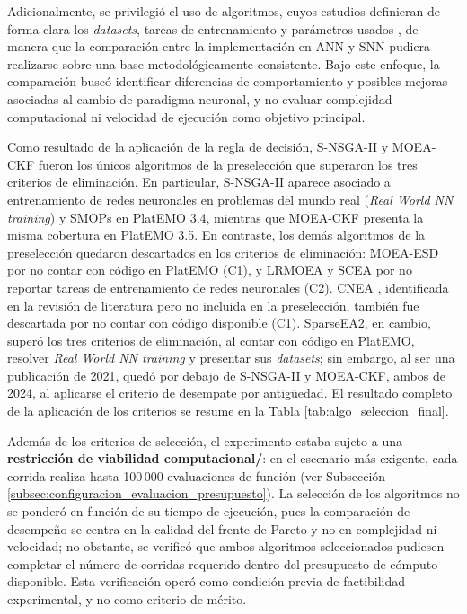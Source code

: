 Adicionalmente, se privilegió el uso de algoritmos, cuyos estudios definieran de forma clara los \textit{datasets}, tareas de entrenamiento y parámetros usados \cite{MOEA/CKF, Yue2025CNEA, 10066873_S-NSGA-II}, de manera que la comparación entre la implementación en ANN y SNN pudiera realizarse sobre una base metodológicamente consistente. Bajo este enfoque, la comparación buscó identificar diferencias de comportamiento y posibles mejoras asociadas al cambio de paradigma neuronal, y no evaluar complejidad computacional ni velocidad de ejecución como objetivo principal.

Como resultado de la aplicación de la regla de decisión, S-NSGA-II \cite{10066873_S-NSGA-II} y MOEA-CKF \cite{MOEA/CKF} fueron los únicos algoritmos de la preselección que superaron los tres criterios de eliminación. En particular, S-NSGA-II aparece asociado a entrenamiento de redes neuronales en problemas del mundo real (\textit{Real World NN training}) y SMOPs en PlatEMO 3.4, mientras que MOEA-CKF presenta la misma cobertura en PlatEMO 3.5. En contraste, los demás algoritmos de la preselección quedaron descartados en los criterios de eliminación: MOEA-ESD por no contar con código en PlatEMO (C1), y LRMOEA y SCEA por no reportar tareas de entrenamiento de redes neuronales (C2). CNEA \cite{Yue2025CNEA}, identificada en la revisión de literatura pero no incluida en la preselección, también fue descartada por no contar con código disponible (C1). SparseEA2, en cambio, superó los tres criterios de eliminación, al contar con código en PlatEMO, resolver \textit{Real World NN training} y presentar sus \textit{datasets}; sin embargo, al ser una publicación de 2021, quedó por debajo de S-NSGA-II y MOEA-CKF, ambos de 2024, al aplicarse el criterio de desempate por antigüedad. El resultado completo de la aplicación de los criterios se resume en la Tabla \ref{tab:algo_seleccion_final}.

Además de los criterios de selección, el experimento estaba sujeto a una \textbf{restricción de viabilidad computacional/}: en el escenario más exigente, cada corrida realiza hasta 100\,000 evaluaciones de función (ver Subsección \ref{subsec:configuracion_evaluacion_presupuesto}). La selección de los algoritmos no se ponderó en función de su tiempo de ejecución, pues la comparación de desempeño se centra en la calidad del frente de Pareto y no en complejidad ni velocidad; no obstante, se verificó que ambos algoritmos seleccionados pudiesen completar el número de corridas requerido dentro del presupuesto de cómputo disponible. Esta verificación operó como condición previa de factibilidad experimental, y no como criterio de mérito.

